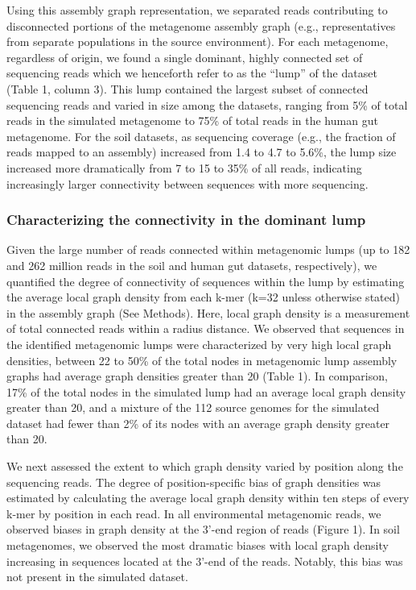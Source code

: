 \documentclass[10pt]{article}
\begin{document}
Using this assembly graph representation, we separated reads
contributing to disconnected portions of the metagenome assembly graph
(e.g., representatives from separate populations in the source
environment).  For each metagenome, regardless of origin, we found a
single dominant, highly connected set of sequencing reads which we
henceforth refer to as the ``lump'' of the dataset (Table 1, column
3).  This lump contained the largest subset of connected sequencing
reads and varied in size among the datasets, ranging from 5\% of total
reads in the simulated metagenome to 75\% of total reads in the human
gut metagenome.  For the soil datasets, as sequencing coverage (e.g.,
the fraction of reads mapped to an assembly) increased from 1.4 to 4.7
to 5.6\%, the lump size increased more dramatically from 7 to 15 to
35\% of all reads, indicating increasingly larger connectivity between
sequences with more sequencing.

\subsubsection*{Characterizing the connectivity in the dominant lump}

Given the large number of reads connected within metagenomic lumps (up
to 182 and 262 million reads in the soil and human gut datasets,
respectively), we quantified the degree of connectivity of sequences
within the lump by estimating the average local graph density from
each k-mer (k=32 unless otherwise stated) in the assembly graph (See
Methods).  Here, local graph density is a measurement of total
connected reads within a radius distance.  We observed that sequences
in the identified metagenomic lumps were characterized by very high
local graph densities, between 22 to 50\% of the total nodes in
metagenomic lump assembly graphs had average graph densities greater
than 20 (Table 1).  In comparison, 17\% of the total nodes in the
simulated lump had an average local graph density greater than 20, and
a mixture of the 112 source genomes for the simulated dataset had
fewer than 2\% of its nodes with an average graph density greater than
20.

We next assessed the extent to which graph density varied by position
along the sequencing reads.  The degree of position-specific bias of
graph densities was estimated by calculating the average local graph
density within ten steps of every k-mer by position in each read.  In
all environmental metagenomic reads, we observed biases in graph
density at the 3'-end region of reads (Figure 1).  In soil
metagenomes, we observed the most dramatic biases with local graph
density increasing in sequences located at the 3'-end of the reads.
Notably, this bias was not present in the simulated dataset.
\end{document}
